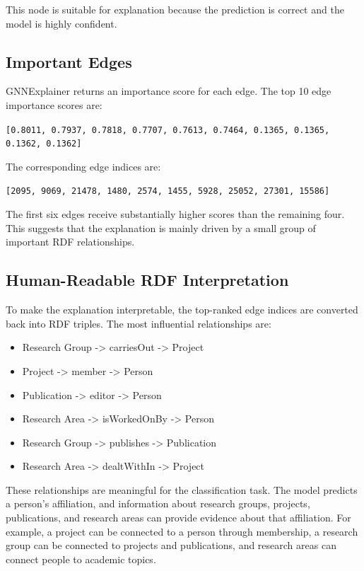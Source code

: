 \documentclass[runningheads]{llncs}
\begin{document}
This node is suitable for explanation because the prediction is correct and the model is highly confident.

\subsection{Important Edges}

GNNExplainer returns an importance score for each edge. The top 10 edge importance scores are:

\begin{center}
\texttt{[0.8011, 0.7937, 0.7818, 0.7707, 0.7613, 0.7464, 0.1365, 0.1365, 0.1362, 0.1362]}
\end{center}

The corresponding edge indices are:

\begin{center}
\texttt{[2095, 9069, 21478, 1480, 2574, 1455, 5928, 25052, 27301, 15586]}
\end{center}

The first six edges receive substantially higher scores than the remaining four. This suggests that the explanation is mainly driven by a small group of important RDF relationships.

\subsection{Human-Readable RDF Interpretation}

To make the explanation interpretable, the top-ranked edge indices are converted back into RDF triples. The most influential relationships are:

\begin{itemize}
    \item Research Group -> carriesOut -> Project
    \item Project -> member -> Person
    \item Publication -> editor -> Person
    \item Research Area -> isWorkedOnBy -> Person
    \item Research Group -> publishes -> Publication
    \item Research Area -> dealtWithIn -> Project
\end{itemize}

These relationships are meaningful for the classification task. The model predicts a person's affiliation, and information about research groups, projects, publications, and research areas can provide evidence about that affiliation. For example, a project can be connected to a person through membership, a research group can be connected to projects and publications, and research areas can connect people to academic topics.
\end{document}
